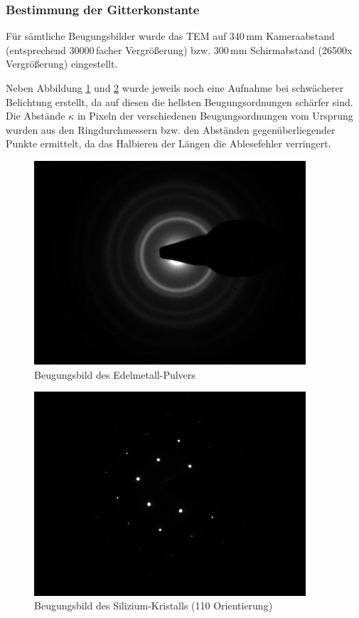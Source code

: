 \newpage
\subsubsection{Bestimmung der Gitterkonstante}
Für sämtliche Beugungsbilder wurde das TEM auf 340\,mm Kameraabstand (entsprechend 30000\,facher Vergrößerung) bzw. 300\,mm Schirmabstand (26500x Vergrößerung) eingestellt.

Neben Abbildung \ref{fig:Edel} und \ref{fig:Si} wurde jeweils noch eine Aufnahme bei schwächerer Belichtung erstellt, da auf diesen die hellsten Beugungsordnungen schärfer sind. Die Abstände $\kappa$ in Pixeln der verschiedenen Beugungsordnungen vom Ursprung wurden aus den Ringdurchmessern bzw. den Abständen gegenüberliegender Punkte ermittelt, da das Halbieren der Längen die Ablesefehler verringert.


\begin{figure}[p]
	\centering
	\includegraphics[width=0.9\textwidth]{data/Im_10.jpg}
	\caption{Beugungsbild des Edelmetall-Pulvers}				\label{fig:Edel}
\end{figure}

\begin{figure}[p]
	\centering
	\includegraphics[width=0.9\textwidth]{data/Im_22.jpg}
	\caption{Beugungsbild des Silizium-Kristalls (110 Orientierung)}	\label{fig:Si}
	\vspace{-5em}
\end{figure}


